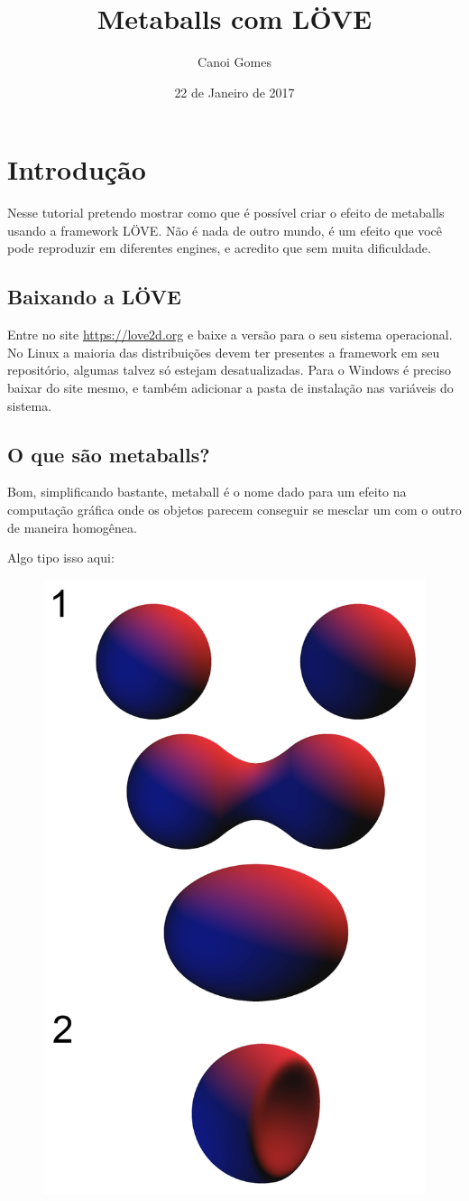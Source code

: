 \documentclass[a4paper,oneside,12pt]{article}
\title{Metaballs com LÖVE}
\author{Canoi Gomes}
\date{22 de Janeiro de 2017}
\begin{document}
\maketitle
\newpage

\tableofcontents
\newpage

\section{Introdução}

Nesse tutorial pretendo mostrar como que é possível criar o efeito de metaballs usando a framework LÖVE. Não é nada de outro mundo, é um efeito que você pode reproduzir em diferentes engines, e acredito que sem muita dificuldade.

\subsection{Baixando a LÖVE}

Entre no site \url{https://love2d.org} e baixe a versão para o seu sistema operacional. No Linux a maioria das distribuições devem ter presentes a framework em seu repositório, algumas talvez só estejam desatualizadas. Para o Windows é preciso baixar do site mesmo, e também adicionar a pasta de instalação nas variáveis do sistema.

\subsection{O que são metaballs?}

Bom, simplificando bastante, metaball é o nome dado para um efeito na computação gráfica onde os objetos parecem conseguir se mesclar um com o outro de maneira homogênea.

Algo tipo isso aqui:

\begin{figure}[h]
    \centering
    \includegraphics[width=0.5\linewidth]{media/metaballs.png}
\end{figure}
\break
\end{document}
